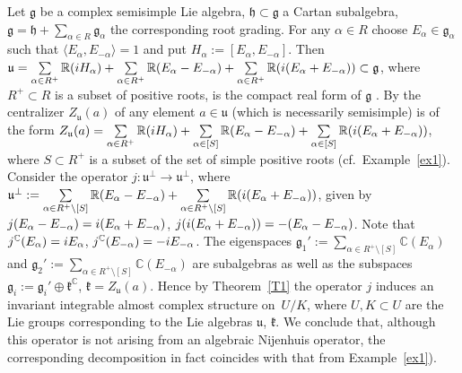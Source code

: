 \documentclass[11pt]{article}
\numberwithin{equation}{section}
\begin{document}
\begin{Example}\label{exa2}Let $\mathfrak{g}$ be a complex semisimple Lie algebra, $\mathfrak{h} \subset\mathfrak{g}$ a Cartan subalgebra, $\mathfrak{g}=\mathfrak{h}+\sum\limits_{\alpha\in R}\mathfrak{g}_\alpha$ the corresponding root grading. For any $\alpha\in R$ choose $E_\alpha\in\mathfrak{g}_\alpha$ such that $\langle E_\alpha,E_{-\alpha}\rangle=1$ and put $H_\alpha:=[E_\alpha,E_{-\alpha}]$. Then $\mathfrak{u}=\sum\limits_{\alpha\in R^+}\mathbb{R}({\rm i} H_\alpha)+\sum\limits_{\alpha\in R^+}\mathbb{R}(E_\alpha-E_{-\alpha})+\sum\limits_{\alpha\in R^+}\mathbb{R}({\rm i}(E_\alpha+E_{-\alpha})) \subset\mathfrak{g}$, where $R^+ \subset R$ is a subset of positive roots, is the compact real form of $\mathfrak{g}$ \cite[Theorem~6.3, Chapter~III]{helgason}. By \cite[Theorem~1.3, Chapter~6]{vinbergOnishIII} the centralizer $Z_\mathfrak{u}(a)$ of any element $a\in\mathfrak{u}$ (which is necessarily semisimple) is of the form $Z_\mathfrak{u}(a)=\sum\limits_{\alpha\in R^+}\mathbb{R}({\rm i} H_\alpha)+\sum\limits_{\alpha\in [S]}\mathbb{R}(E_\alpha-E_{-\alpha})+\sum\limits_{\alpha\in [S]}\mathbb{R}({\rm i}(E_\alpha+E_{-\alpha}))$, where $S \subset R^+$ is a subset of the set of simple positive roots (cf.\ Example~\ref{ex1}). Consider the operator $j\colon \mathfrak{u}^\perp\to \mathfrak{u}^\perp$, where $\mathfrak{u}^\perp:=\sum\limits_{\alpha\in R^+\setminus[S]}\mathbb{R}(E_\alpha-E_{-\alpha})+\sum\limits_{\alpha\in R^+\setminus[S]}\mathbb{R}({\rm i}(E_\alpha+E_{-\alpha}))$, given by $ j(E_\alpha - E_{-\alpha} ) = {\rm i} ( E_\alpha + E_{-\alpha})$, $j( {\rm i} (E_\alpha + E_{-\alpha} ))=- ( E_\alpha - E_{-\alpha})$. Note that $j^\mathbb{C}(E_\alpha)={\rm i}E_\alpha$, $j^\mathbb{C}(E_{-\alpha})=-{\rm i}E_{-\alpha}$. The eigenspaces $\mathfrak{g}_1':=\sum\limits_{\alpha\in R^+\setminus[S]}\mathbb{C}(E_\alpha)$ and $\mathfrak{g}_2':=\sum\limits_{\alpha\in R^+\setminus[S]}\mathbb{C}(E_{-\alpha})$ are subalgebras as well as the subspaces $\mathfrak{g}_i:=\mathfrak{g}_i'\oplus\mathfrak{k}^\mathbb{C}$, $\mathfrak{k}=Z_\mathfrak{u}(a)$. Hence by Theorem~\ref{T1} the operator $j$ induces an invariant integrable almost complex structure on~$U/K$, where $U,K \subset U$ are the Lie groups corresponding to the Lie algebras $\mathfrak{u}$, $\mathfrak{k}$. We conclude that, although this operator is not arising from an algebraic Nijenhuis operator, the corresponding decomposition in fact coincides with that from Example~\ref{ex1}).
\end{Example}
\end{document}
